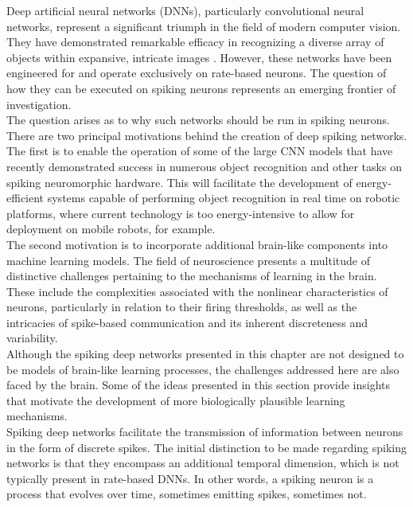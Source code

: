 Deep artificial neural networks (DNNs), particularly convolutional neural networks, represent a significant triumph in the field of modern computer vision. They have demonstrated remarkable efficacy in recognizing a diverse array of objects within expansive, intricate images \cite{krizhevsky2012imagenet}. However, these networks have been engineered for and operate exclusively on rate-based neurons. The question of how they can be executed on spiking neurons represents an emerging frontier of investigation.\\

\noindent The question arises as to why such networks should be run in spiking neurons. There are two principal motivations behind the creation of deep spiking networks. The first is to enable the operation of some of the large CNN models that have recently demonstrated success in numerous object recognition and other tasks on spiking neuromorphic hardware. This will facilitate the development of energy-efficient systems capable of performing object recognition in real time on robotic platforms, where current technology is too energy-intensive to allow for deployment on mobile robots, for example. \\

\noindent The second motivation is to incorporate additional brain-like components into machine learning models. The field of neuroscience presents a multitude of distinctive challenges pertaining to the mechanisms of learning in the brain. These include the complexities associated with the nonlinear characteristics of neurons, particularly in relation to their firing thresholds, as well as the intricacies of spike-based communication and its inherent discreteness and variability. \\

\noindent Although the spiking deep networks presented in this chapter are not designed to be models of brain-like learning processes, the challenges addressed here are also faced by the brain. Some of the ideas presented in this section provide insights that motivate the development of more biologically plausible learning mechanisms.\\

\noindent Spiking deep networks facilitate the transmission of information between neurons in the form of discrete spikes. The initial distinction to be made regarding spiking networks is that they encompass an additional temporal dimension, which is not typically present in rate-based DNNs. In other words, a spiking neuron is a process that evolves over time, sometimes emitting spikes, sometimes not.\\

